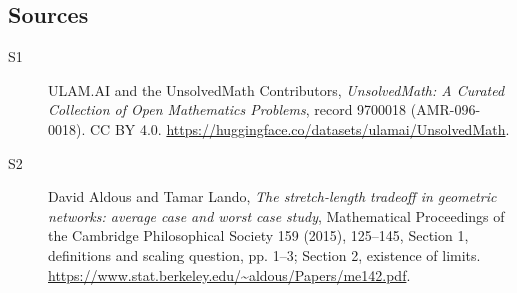 \documentclass[11pt]{article}
\begin{document}
\subsection{Sources}
\begin{description}
\item[\hypertarget{source:9700018:1}{S1}] ULAM.AI and the UnsolvedMath Contributors, \emph{UnsolvedMath: A Curated Collection of Open Mathematics Problems}, record 9700018 (AMR-096-0018). CC BY 4.0. \url{https://huggingface.co/datasets/ulamai/UnsolvedMath}.
\item[\hypertarget{source:9700018:2}{S2}] David Aldous and Tamar Lando, \emph{The stretch-length tradeoff in geometric networks: average case and worst case study}, Mathematical Proceedings of the Cambridge Philosophical Society 159 (2015), 125--145, Section 1, definitions and scaling question, pp. 1--3; Section 2, existence of limits. \url{https://www.stat.berkeley.edu/~aldous/Papers/me142.pdf}.
\end{description}
\label{end:9700018}
\end{document}
